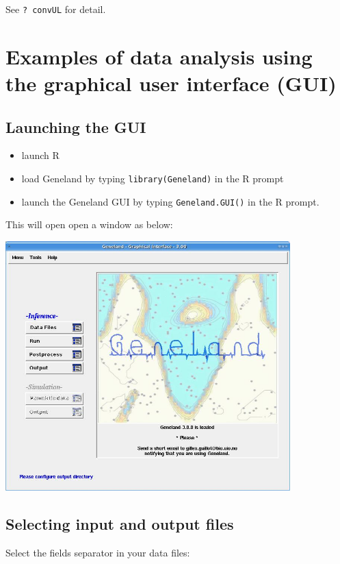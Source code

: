 \documentclass[a4paper,10pt]{article}
\begin{document}
See {\tt ? convUL} for detail.



\clearpage
\section[Examples with the GUI]{Examples of data analysis using the graphical user interface (GUI)}

\subsection{Launching the GUI}

\begin{itemize}
\item launch R
\item load {\sc Geneland} by typing \texttt{library(Geneland)} in the R prompt
\item launch the {\sc Geneland} GUI by typing \texttt{Geneland.GUI()} in the R prompt.
\end{itemize}

This will open open a window as below:\\

\centerline{\includegraphics[width=11cm]{./fig/initial.jpg}}

\clearpage
\subsection{Selecting input and output files}


Select the fields separator in your data files:\\
\end{document}
